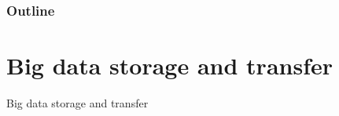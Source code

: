 \documentclass[aspectratio=169,dvipsnames]{beamer}
\begin{document}
    \begin{frame}
    \frametitle{Outline}
    \begin{minipage}{0.25\textwidth}
    \mbox{}
    \end{minipage}
    \begin{minipage}{0.6\textwidth}
    \tableofcontents
    \end{minipage}
    \end{frame}
    
\section{Big data storage and transfer}
\begin{frame}[plain]
\hfill\LARGE Big data storage and transfer \hfill\normalsize
\end{frame}
\end{document}
